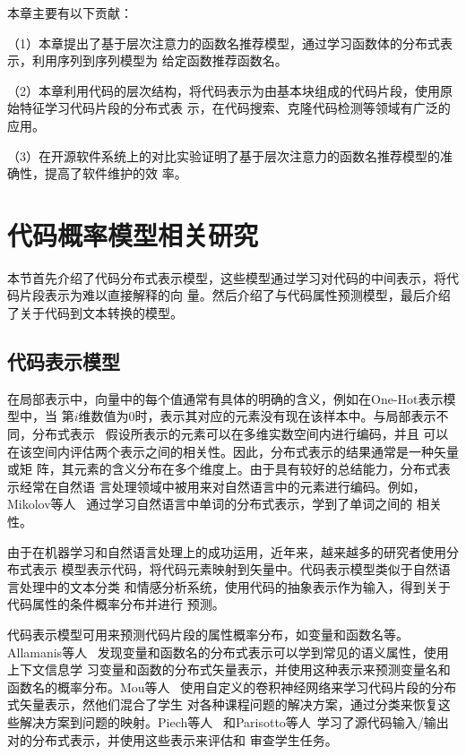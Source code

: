 本章主要有以下贡献：

（1）本章提出了基于层次注意力的函数名推荐模型，通过学习函数体的分布式表示，利用序列到序列模型为
给定函数推荐函数名。

（2）本章利用代码的层次结构，将代码表示为由基本块组成的代码片段，使用原始特征学习代码片段的分布式表
示，在代码搜索、克隆代码检测等领域有广泛的应用。

（3）在开源软件系统上的对比实验证明了基于层次注意力的函数名推荐模型的准确性，提高了软件维护的效
率。

\section{代码概率模型相关研究}
本节首先介绍了代码分布式表示模型，这些模型通过学习对代码的中间表示，将代码片段表示为难以直接解释的向
量。然后介绍了与代码属性预测模型，最后介绍了关于代码到文本转换的模型。

\subsection{代码表示模型}
在局部表示中，向量中的每个值通常有具体的明确的含义，例如在One-Hot表示模型中，当
第$i$维数值为0时，表示其对应的元素没有现在该样本中。与局部表示不同，分布式表示
~\cite{hinton1984distributed}假设所表示的元素可以在多维实数空间内进行编码，并且
可以在该空间内评估两个表示之间的相关性。因此，分布式表示的结果通常是一种矢量或矩
阵，其元素的含义分布在多个维度上。由于具有较好的总结能力，分布式表示经常在自然语
言处理领域中被用来对自然语言中的元素进行编码。例如，Mikolov等人
~\cite{mikolov2013efficient}通过学习自然语言中单词的分布式表示，学到了单词之间的
相关性。

由于在机器学习和自然语言处理上的成功运用，近年来，越来越多的研究者使用分布式表示
模型表示代码，将代码元素映射到矢量中。代码表示模型类似于自然语言处理中的文本分类
和情感分析系统，使用代码的抽象表示作为输入，得到关于代码属性的条件概率分布并进行
预测。

代码表示模型可用来预测代码片段的属性概率分布，如变量和函数名等。Allamanis等人
~\cite{allamanis2015suggesting}发现变量和函数名的分布式表示可以学到常见的语义属性，使用上下文信息学
习变量和函数的分布式矢量表示，并使用这种表示来预测变量名和函数名的概率分布。Mou等人
~\cite{mou2016convolutional}使用自定义的卷积神经网络来学习代码片段的分布式矢量表示，然他们混合了学生
对各种课程问题的解决方案，通过分类来恢复这些解决方案到问题的映射。Piech等人~\cite{piech2015learning}
和Parisotto等人~\cite{parisotto2017neuro}学习了源代码输入/输出对的分布式表示，并使用这些表示来评估和
审查学生任务。

